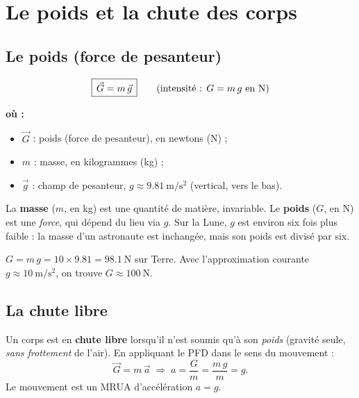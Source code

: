 \documentclass[11pt,a4paper]{article}
\newenvironment{ou}{%
  \par\smallskip\noindent\textbf{où :}\nopagebreak
  \begin{itemize}[leftmargin=1.8em,topsep=2pt,itemsep=1.5pt,parsep=0pt]}%
  {\end{itemize}}
\newcommand{\vv}[1]{\vec{#1}}
\begin{document}
\section{Le poids et la chute des corps}

\subsection{Le poids (force de pesanteur)}

\begin{formule}
\[ \boxed{\,\vv G = m\,\vv g\,}\qquad\text{(intensité : } G=m\,g\ \text{en \si{\newton})} \]
\begin{ou}
  \item $\vv G$ : poids (force de pesanteur), en newtons (\si{\newton}) ;
  \item $m$ : masse, en kilogrammes (\si{\kilogram}) ;
  \item $\vv g$ : champ de pesanteur, $g\approx\qty{9,81}{\metre\per\second\squared}$ (vertical, vers le bas).
\end{ou}
\end{formule}

\begin{attention}
La \textbf{masse} ($m$, en \si{\kilogram}) est une quantité de matière, invariable. Le \textbf{poids}
($G$, en \si{\newton}) est une \emph{force}, qui dépend du lieu via $g$. Sur la Lune, $g$ est environ
six fois plus faible : la masse d'un astronaute est inchangée, mais son poids est divisé par six.
\end{attention}

\begin{exemple}
$G = m\,g = 10\times\num{9,81}=\qty{98,1}{\newton}$ sur Terre. Avec l'approximation courante
$g\approx\qty{10}{\metre\per\second\squared}$, on trouve $G\approx\qty{100}{\newton}$.
\end{exemple}

\subsection{La chute libre}

\begin{definition}
Un corps est en \textbf{chute libre} lorsqu'il n'est soumis qu'à son \emph{poids} (gravité seule,
\emph{sans frottement} de l'air). En appliquant le PFD dans le sens du mouvement :
\[ \vv G = m\,\vv a \;\Longrightarrow\; a=\frac{G}{m}=\frac{m\,g}{m}=g. \]
Le mouvement est un MRUA d'accélération $a=g$.
\end{definition}
\end{document}
